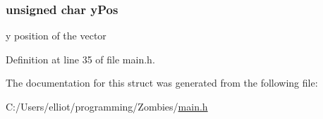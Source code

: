\subsubsection[{y\+Pos}]{\setlength{\rightskip}{0pt plus 5cm}unsigned char y\+Pos}\label{structvector_data_a32a1f52aacf96b5af1f9b505ff1242cd}
y position of the vector 

Definition at line 35 of file main.\+h.



The documentation for this struct was generated from the following file\+:\begin{DoxyCompactItemize}
\item 
C\+:/\+Users/elliot/programming/\+Zombies/\hyperlink{main_8h}{main.\+h}\end{DoxyCompactItemize}
